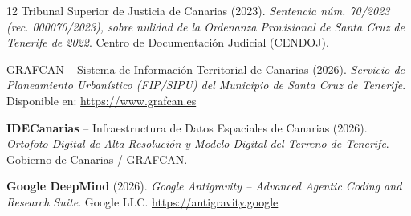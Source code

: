 \begin{thebibliography}{12}
Tribunal Superior de Justicia de Canarias (2023).
\textit{Sentencia núm. 70/2023 (rec. 000070/2023), sobre nulidad de la Ordenanza Provisional de Santa Cruz de Tenerife de 2022}.
Centro de Documentación Judicial (CENDOJ).

GRAFCAN -- Sistema de Información Territorial de Canarias (2026).
\textit{Servicio de Planeamiento Urbanístico (FIP/SIPU) del Municipio de Santa Cruz de Tenerife}.
Disponible en: \url{https://www.grafcan.es}

\textbf{IDECanarias} -- Infraestructura de Datos Espaciales de Canarias (2026).
\textit{Ortofoto Digital de Alta Resolución y Modelo Digital del Terreno de Tenerife}.
Gobierno de Canarias / GRAFCAN.

\textbf{Google DeepMind} (2026).
\textit{Google Antigravity -- Advanced Agentic Coding and Research Suite}.
Google LLC. \url{https://antigravity.google}

\end{thebibliography}
